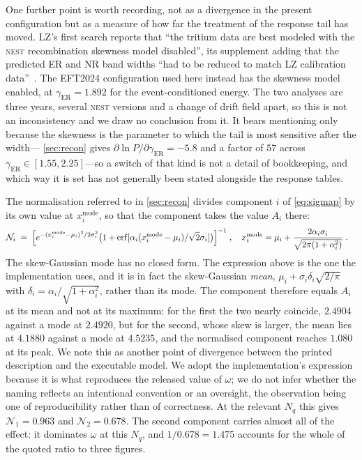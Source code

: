\documentclass[11pt,a4paper]{article}
\begin{document}
One further point is worth recording, not as a divergence in the present
configuration but as a measure of how far the treatment of the response
tail has moved. LZ's first search reports that ``the tritium data are
best modeled with the \textsc{nest} recombination skewness model
disabled'', its supplement adding that the predicted ER and NR band
widths ``had to be reduced to match LZ calibration
data''~\cite{WS2022}. The \textsf{EFT2024} configuration used here
instead has the skewness model enabled, at
\(\gamma_\mathrm{ER}=1.892\) for the event-conditioned energy. The two
analyses are three years, several \textsc{nest} versions and a change of
drift field apart, so this is not an inconsistency and we draw no
conclusion from it. It bears mentioning only because the skewness is the
parameter to which the tail is most sensitive after the width---
\cref{sec:recon} gives \(\partial\ln P/\partial\gamma_\mathrm{ER}=-5.8\)
and a factor of \(57\) across \(\gamma_\mathrm{ER}\in[1.55,2.25]\)---so
a switch of that kind is not a detail of bookkeeping, and which way it
is set has not generally been stated alongside the response tables.

The normalisation referred to in \cref{sec:recon} divides component \(i\) of
\cref{eq:sigmap} by its own value at \(x_i^\mathrm{mode}\), so that the
component takes the value \(A_i\) there:
\begin{align}
    \mathcal{N}_i\;&=\;\Big[e^{-(x_i^\mathrm{mode}-\mu_i)^2/2\sigma_i^2}
        \big(1+\mathrm{erf}[\alpha_i(x_i^{\rm
    mode}-\mu_i)/\sqrt{2}\sigma_i]\big)\Big]^{-1}\;,
\quad
x_i^\mathrm{mode}=\mu_i+\frac{2\alpha_i\sigma_i}{\sqrt{2\pi(1+\alpha_i^{2})}}\;.
\end{align}
The skew-Gaussian mode has no closed form. The expression above is the one
the implementation uses, and it is in fact the skew-Gaussian \emph{mean},
\(\mu_i+\sigma_i\delta_i\sqrt{2/\pi}\) with
\(\delta_i=\alpha_i/\sqrt{1+\alpha_i^2}\), rather than its mode. The
component therefore equals \(A_i\) at its mean and not at its maximum: for
the first the two nearly coincide, \(2.4904\) against a mode at \(2.4920\),
but for the second, whose skew is larger, the mean lies at \(4.1880\)
against a mode at \(4.5235\), and the normalised component reaches
\(1.080\) at its peak. We note this as another point of divergence between
the printed description and the executable model. We adopt the
implementation's expression because it is what reproduces the released
value of \(\omega\); we do not infer whether the naming reflects an
intentional convention or an oversight, the observation being one of
reproducibility rather than of correctness. At the relevant \(N_q\) this
gives \(\mathcal{N}_1=0.963\) and \(\mathcal{N}_2=0.678\). The second
component carries almost all of the effect: it dominates \(\omega\) at this
\(N_q\), and \(1/0.678=1.475\) accounts for the whole of the quoted ratio to
three figures.
\end{document}
